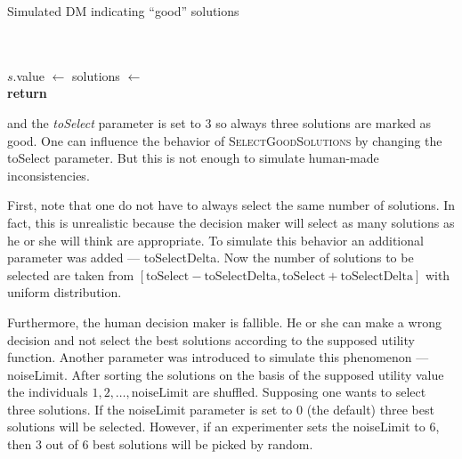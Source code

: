 \begin{algorithm}
  \caption{Simulated DM indicating ``good'' solutions}\label{alg:dmselection}
  \begin{algorithmic}[1]
     \\
     \\
    \State $s.$value $\gets$ 
    \EndFor
    \State solutions $\gets$  \\
    \State \textbf{return} 
    \EndProcedure
  \end{algorithmic}
\end{algorithm}

and the \textit{toSelect} parameter is set to $3$ so always three solutions
are marked as good. One can influence the behavior of
\textsc{SelectGoodSolutions} by changing the toSelect parameter. But this is
not enough to simulate human-made inconsistencies.

First, note that one do not have to always select the same number of
solutions. In fact, this is unrealistic because the decision maker will select
as many solutions as he or she will think are appropriate. To simulate this
behavior an additional parameter was added --- toSelectDelta. Now the number
of solutions to be selected are taken from $[\text{toSelect} -
\text{toSelectDelta}, \text{toSelect} + \text{toSelectDelta}]$ with uniform
distribution.

Furthermore, the human decision maker is fallible. He or she can make a wrong
decision and not select the best solutions according to the supposed utility
function. Another parameter was introduced to simulate this phenomenon ---
noiseLimit. After sorting the solutions on the basis of the supposed utility
value the individuals $1, 2, \dots, \text{noiseLimit}$ are shuffled. Supposing
one wants to select three solutions. If the noiseLimit parameter is set to $0$
(the default) three best solutions will be selected. However, if an
experimenter sets the noiseLimit to $6$, then $3$ out of $6$ best solutions
will be picked by random.

